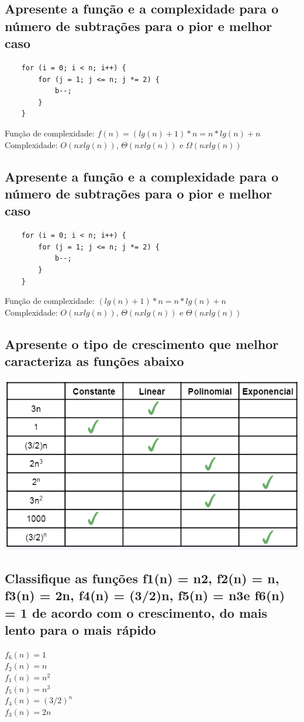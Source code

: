 \documentclass[12pt]{article}
\begin{document}
{\subsection{Apresente a função e a complexidade para o número de subtrações para o pior e melhor caso} 
\begin{lstlisting}
    for (i = 0; i < n; i++) {
        for (j = 1; j <= n; j *= 2) {
            b--;
        }
    }
\end{lstlisting}
Função de complexidade: $f(n) = (lg(n) + 1) * n = n * lg(n) + n$
Complexidade: $O(n x lg(n))$, $\Theta(n x lg(n))$ e $\Omega(n x lg(n))$

\subsection{Apresente a função e a complexidade para o número de subtrações para o pior e melhor caso}
\begin{lstlisting}
    for (i = 0; i < n; i++) {
        for (j = 1; j <= n; j *= 2) {
            b--;
        }
    }
\end{lstlisting}
Função de complexidade: $(lg(n) + 1) * n = n * lg(n) + n$\\
Complexidade: $O(n x lg(n))$, $\Theta(n x lg(n))$ e $\Theta(n x lg(n))$

\subsection{Apresente o tipo de crescimento que melhor caracteriza as funções abaixo}
\includegraphics{images/exercicio_16.png}

\subsection{Classifique as funções f1(n) = n2, f2(n) = n, f3(n) = 2n, f4(n) = (3/2)n, f5(n) = n3e f6(n) = 1 de acordo com o crescimento, do mais lento para o mais rápido}
$f_{6}(n) = 1$
\\$f_{2}(n) = n$
\\$f_{1}(n) = n^2$
\\$f_{5}(n) = n^3$
\\$f_{4}(n) = (3/2)^n$
\\$f_{3}(n) = 2n$

}
\end{document}
